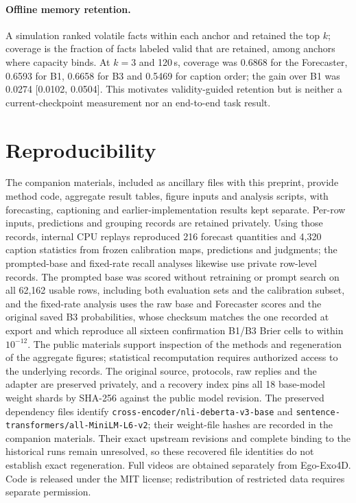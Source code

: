 \documentclass[10pt]{article}
\begin{document}
\paragraph{Offline memory retention.} A simulation ranked volatile facts within each anchor and retained the top $k$; coverage is the fraction of facts labeled valid that are retained, among anchors where capacity binds. At $k=3$ and 120\,s, coverage was 0.6868 for the Forecaster, 0.6593 for B1, 0.6658 for B3 and 0.5469 for caption order; the gain over B1 was 0.0274 [0.0102, 0.0504]. This motivates validity-guided retention but is neither a current-checkpoint measurement nor an end-to-end task result.

\section{Reproducibility}
\label{app:repro}
The companion materials, included as ancillary files with this preprint, provide method code, aggregate result tables, figure inputs and analysis scripts, with forecasting, captioning and earlier-implementation results kept separate. Per-row inputs, predictions and grouping records are retained privately. Using those records, internal CPU replays reproduced 216 forecast quantities and 4,320 caption statistics from frozen calibration maps, predictions and judgments; the prompted-base and fixed-rate recall analyses likewise use private row-level records. The prompted base was scored without retraining or prompt search on all 62,162 usable rows, including both evaluation sets and the calibration subset, and the fixed-rate analysis uses the raw base and Forecaster scores and the original saved B3 probabilities, whose checksum matches the one recorded at export and which reproduce all sixteen confirmation B1/B3 Brier cells to within $10^{-12}$. The public materials support inspection of the methods and regeneration of the aggregate figures; statistical recomputation requires authorized access to the underlying records. The original source, protocols, raw replies and the adapter are preserved privately, and a recovery index pins all 18 base-model weight shards by SHA-256 against the public model revision. The preserved dependency files identify \texttt{cross-encoder/nli-deberta-v3-base} and \texttt{sentence-transformers/all-MiniLM-L6-v2}; their weight-file hashes are recorded in the companion materials. Their exact upstream revisions and complete binding to the historical runs remain unresolved, so these recovered file identities do not establish exact regeneration. Full videos are obtained separately from Ego-Exo4D. Code is released under the MIT license; redistribution of restricted data requires separate permission.
\end{document}
